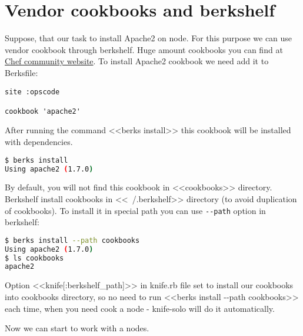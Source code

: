 \section{Vendor cookbooks and berkshelf}

Suppose, that our task to install Apache2 on node. For this purpose we can use vendor cookbook through berkshelf. Huge amount cookbooks you can find at \href{http://community.opscode.com/cookbooks}{Chef community website}. To install Apache2 cookbook we need add it to Berksfile:

\begin{lstlisting}[label=lst:my-cloud-berkshelf1,title=my-cloud/Berksfile]
site :opscode

cookbook 'apache2'
\end{lstlisting}

After running the command <<berks install>> this cookbook will be installed with dependencies.

\begin{lstlisting}[language=Bash,label=lst:my-cloud-berkshelf2,title=my-cloud/Berksfile]
$ berks install
Using apache2 (1.7.0)
\end{lstlisting}

By default, you will not find this cookbook in <<cookbooks>> directory. Berkshelf install cookbooks in <<~/.berkshelf>> directory (to avoid duplication of cookbooks). To install it in special path you can use \texttt{-\--path} option in berkshelf:

\begin{lstlisting}[language=Bash,label=lst:my-cloud-berkshelf3,title=my-cloud/Berksfile]
$ berks install --path cookbooks
Using apache2 (1.7.0)
$ ls cookbooks
apache2
\end{lstlisting}

Option <<knife[:berkshelf\_path]>> in knife.rb file set to install our cookbooks into cookbooks directory, so no need to run <<berks install -\--path cookbooks>> each time, when you need cook a node - knife-solo will do it automatically.

Now we can start to work with a nodes.